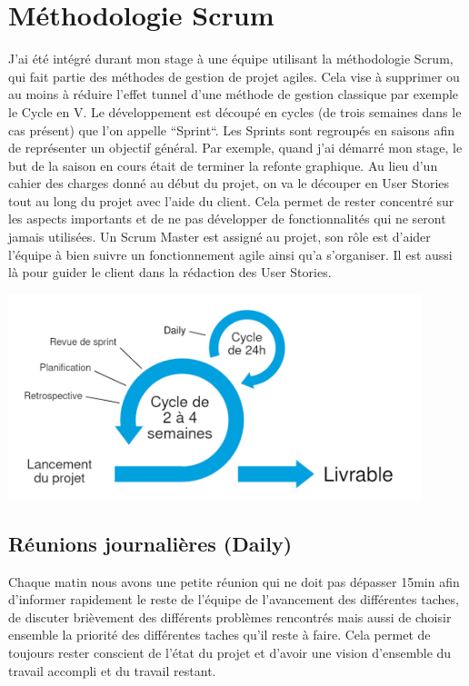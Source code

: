 \documentclass[12pt, a4paper]{report}
\begin{document}
        \section{Méthodologie Scrum}
            J'ai été intégré durant mon stage à une équipe utilisant la méthodologie Scrum, qui fait partie des méthodes de gestion de projet agiles. Cela vise à supprimer ou au moins à réduire l'effet tunnel d'une méthode de gestion classique par exemple le Cycle en V.\newline
            Le développement est découpé en cycles (de trois semaines dans le cas présent) que l'on appelle ``Sprint``.\newline
            Les Sprints sont regroupés en saisons afin de représenter un objectif général.
            Par exemple, quand j'ai démarré mon stage, le but de la saison en cours était de terminer la refonte graphique.
            Au lieu d'un cahier des charges donné au début du projet, on va le découper en User Stories tout au long du projet avec l'aide du client.\newline
            Cela permet de rester concentré sur les aspects importants et de ne pas développer de fonctionnalités qui ne seront jamais utilisées.\newline
            Un Scrum Master est assigné au projet, son rôle est d'aider l'équipe à bien suivre un fonctionnement agile ainsi qu'a s'organiser. Il est aussi là pour guider le client dans la rédaction des User Stories.
            \begin{center}
                \includegraphics[width=0.9\textwidth]{scrum.jpg}
            \end{center}
            \subsection{Réunions journalières (Daily)}
                Chaque matin nous avons une petite réunion qui ne doit pas dépasser 15min afin d'informer rapidement le reste de l'équipe de l'avancement des différentes taches, de discuter brièvement des différents problèmes rencontrés mais aussi de choisir ensemble la priorité des différentes taches qu'il reste à faire.\newline
                Cela permet de toujours rester conscient de l'état du projet et d'avoir une vision d'ensemble du travail accompli et du travail restant.
\end{document}
